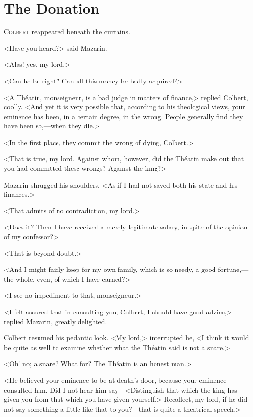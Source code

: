 \chapter{The Donation}

\lettrine{C}{olbert} reappeared beneath the curtains.

\zz
<Have you heard?> said Mazarin.

\zz
<Alas! yes, my lord.>

\zz
<Can he be right? Can all this money be badly acquired?>

\zz
<A Théatin, monseigneur, is a bad judge in matters of finance,> replied Colbert, coolly. <And yet it is very possible that, according to his theological views, your eminence has been, in a certain degree, in the wrong. People generally find they have been so,—when they die.>

<In the first place, they commit the wrong of dying, Colbert.>

<That is true, my lord. Against whom, however, did the Théatin make out that you had committed these wrongs? Against the king?>

Mazarin shrugged his shoulders. <As if I had not saved both his state and his finances.>

<That admits of no contradiction, my lord.>

<Does it? Then I have received a merely legitimate salary, in spite of the opinion of my confessor?>

<That is beyond doubt.>

<And I might fairly keep for my own family, which is so needy, a good fortune,—the whole, even, of which I have earned?>

<I see no impediment to that, monseigneur.>

<I felt assured that in consulting you, Colbert, I should have good advice,> replied Mazarin, greatly delighted.

Colbert resumed his pedantic look. <My lord,> interrupted he, <I think it would be quite as well to examine whether what the Théatin said is not a snare.>

<Oh! no; a snare? What for? The Théatin is an honest man.>

<He believed your eminence to be at death's door, because your eminence consulted him. Did I not hear him say—<Distinguish that which the king has given you from that which you have given yourself.> Recollect, my lord, if he did not say something a little like that to you?—that is quite a theatrical speech.>

